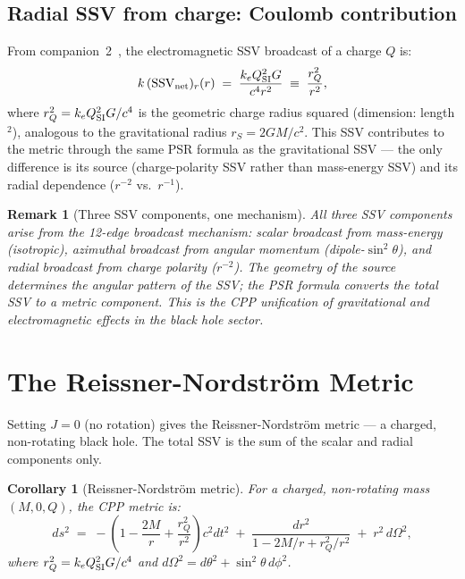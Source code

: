 \documentclass[12pt]{article}
\newtheorem{corollary}[theorem]{Corollary}
\newtheorem{remark}[theorem]{Remark}
\newcommand{\rS}{r_S}
\newcommand{\rQ}{r_Q}
\newcommand{\SSV}{\mathrm{SSV}}
\begin{document}
\subsection{Radial SSV from charge: Coulomb contribution}

From companion~2~\cite{c2}, the electromagnetic SSV broadcast of a
charge $Q$ is:
\begin{equation}
  k\,(\SSV_{\rm net})_r(r) \;=\; \frac{k_e Q_{\rm SI}^2 G}{c^4 r^2}
  \;\equiv\; \frac{\rQ^2}{r^2},
  \label{eq:ssv_charge}
\end{equation}
where $\rQ^2 = k_e Q_{\rm SI}^2 G/c^4$ is the geometric charge radius
squared (dimension: length$^2$), analogous to the gravitational radius
$\rS = 2GM/c^2$.  This SSV contributes to the metric through the same
PSR formula as the gravitational SSV — the only difference is its
source (charge-polarity SSV rather than mass-energy SSV) and its
radial dependence ($r^{-2}$ vs.\ $r^{-1}$).

\begin{remark}[Three SSV components, one mechanism]
All three SSV components arise from the 12-edge broadcast mechanism:
scalar broadcast from mass-energy (isotropic), azimuthal broadcast
from angular momentum (dipole-$\sin^2\theta$), and radial broadcast
from charge polarity ($r^{-2}$).  The geometry of the source
determines the angular pattern of the SSV; the PSR formula converts
the total SSV to a metric component.  This is the CPP unification
of gravitational and electromagnetic effects in the black hole sector.
\end{remark}

\section{The Reissner-Nordström Metric}
\label{sec:rn}

Setting $J = 0$ (no rotation) gives the Reissner-Nordström metric —
a charged, non-rotating black hole.  The total SSV is the sum of the
scalar and radial components only.

\begin{corollary}[Reissner-Nordström metric]
\label{cor:rn}
For a charged, non-rotating mass $(M, 0, Q)$, the CPP metric is:
\begin{equation}
  ds^2 \;=\; -\!\left(1 - \frac{2M}{r} + \frac{\rQ^2}{r^2}\right)c^2dt^2
  \;+\; \frac{dr^2}{1 - 2M/r + \rQ^2/r^2}
  \;+\; r^2\,d\Omega^2,
  \label{eq:rn}
\end{equation}
where $\rQ^2 = k_e Q_{\rm SI}^2 G/c^4$ and
$d\Omega^2 = d\theta^2 + \sin^2\theta\,d\phi^2$.
\end{corollary}
\end{document}
